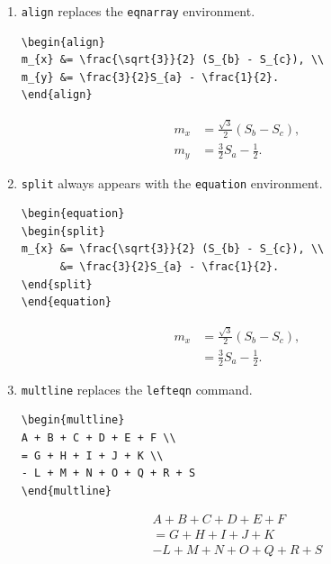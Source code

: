 \documentclass{jpsj2}
\begin{document}
\begin{enumerate}
\item \texttt{align} replaces the \texttt{eqnarray} environment.

\begin{verbatim}
\begin{align}
m_{x} &= \frac{\sqrt{3}}{2} (S_{b} - S_{c}), \\
m_{y} &= \frac{3}{2}S_{a} - \frac{1}{2}.
\end{align}
\end{verbatim}

\begin{align}
m_{x} &= \frac{\sqrt{3}}{2} (S_{b} - S_{c}), \\
m_{y} &= \frac{3}{2}S_{a} - \frac{1}{2}.
\end{align}

\medskip
\item \texttt{split} always appears with the \texttt{equation} environment.

\begin{verbatim}
\begin{equation}
\begin{split}
m_{x} &= \frac{\sqrt{3}}{2} (S_{b} - S_{c}), \\
      &= \frac{3}{2}S_{a} - \frac{1}{2}.
\end{split}
\end{equation}
\end{verbatim}

\begin{equation}
\begin{split}
m_{x} &= \frac{\sqrt{3}}{2} (S_{b} - S_{c}), \\
      &= \frac{3}{2}S_{a} - \frac{1}{2}.
\end{split}
\end{equation}

\medskip
\item \texttt{multline} replaces the \texttt{lefteqn} command.

\begin{verbatim}
\begin{multline}
A + B + C + D + E + F \\
= G + H + I + J + K \\
- L + M + N + O + Q + R + S
\end{multline}
\end{verbatim}

\begin{multline}
A + B + C + D + E + F \\
= G + H + I + J + K \\
- L + M + N + O + Q + R + S
\end{multline}


\end{enumerate}
\end{document}
